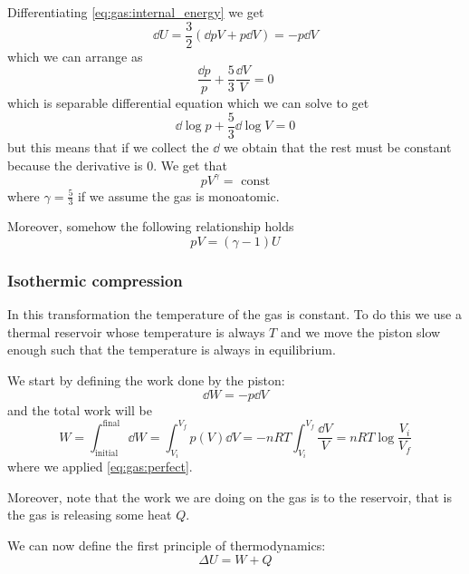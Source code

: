 \documentclass[12pt]{extarticle}
\begin{document}
Differentiating \autoref{eq:gas:internal_energy} we get
\begin{equation}
    \dd{U} = \frac{3}{2} (\dd{p} V + p \dd{V}) = -p\dd{V}
\end{equation}
which we can arrange as
\begin{equation}
    \frac{\dd{p}}{p} + \frac{5}{3}\frac{\dd{V}}{{V}} = 0
\end{equation}
which is separable differential equation which we can solve to get
\begin{equation}
    \dd{\log p} + \frac{5}{3} \dd{\log V} = 0
\end{equation}
but this means that if we collect the $\dd$ we obtain that the rest must be constant because the derivative is $0$.
We get that
\begin{equation}
    p V^\gamma = \text{ const}
\end{equation}
where $\gamma = \frac{5}{3}$ if we assume the gas is monoatomic.

Moreover, somehow the following relationship holds
\begin{equation}
    pV = (\gamma - 1) U
\end{equation}

\subsubsection{Isothermic compression}

In this transformation the temperature of the gas is constant.
To do this we use a thermal reservoir whose temperature is always $T$ and we move the piston slow enough such that the temperature is always in equilibrium.

We start by defining the work done by the piston:
\begin{equation}
    \dd{W} = - p \dd{V}
\end{equation}
and the total work will be
\begin{equation}
    W = \int_\text{initial}^\text{final} \dd{W} = \int_{V_i}^{V_f} p(V) \dd{V} = -nRT \int_{V_i}^{V_f} \frac{\dd{V}}{V} = n R T \log \frac{V_i}{V_f}
\end{equation}
where we applied \autoref{eq:gas:perfect}.

Moreover, note that the work we are doing on the gas is  to the reservoir, that is the gas is releasing some heat $Q$.

We can now define the first principle of thermodynamics:
\begin{equation}
    \label{eq:gas:first_principle}
    \Delta U = W + Q
\end{equation}
\end{document}
